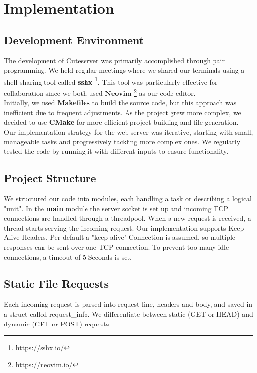 \section*{Implementation}

\subsection*{Development Environment} 
The development of Cuteserver was primarily accomplished through pair programming. We held regular meetings where we shared our terminals using a shell sharing tool called \textbf{sshx} \footnote{https://sshx.io/}. This tool was particularly effective for collaboration since we both used \textbf{Neovim} \footnote{https://neovim.io/} as our code editor. \\
 
Initially, we used \textbf{Makefiles} to build the source code, but this approach was inefficient due to frequent adjustments. As the project grew more complex, we decided to use \textbf{CMake} for more efficient project building and file generation. \\

Our implementation strategy for the web server was iterative, starting with small, manageable tasks and progressively tackling more complex ones. We regularly tested the code by running it with different inputs to ensure functionality.

\subsection*{Project Structure} 
We structured our code into modules, each handling a task or describing a logical "unit". In the \textbf{main} module the server socket is set up and incoming TCP connections are handled through a threadpool. When a new request is received, a thread starts serving the incoming request. Our implementation supports Keep-Alive Headers. Per default a "keep-alive"-Connection is assumed, so multiple responses can be sent over one TCP connection. To prevent too many idle connections, a timeout of 5 Seconds is set. %

\subsection*{Static File Requests}
Each incoming request is parsed into request line, headers and body, and saved in a struct called request\_info. We differentiate between static (GET or HEAD) and dynamic (GET or POST) requests. \\

